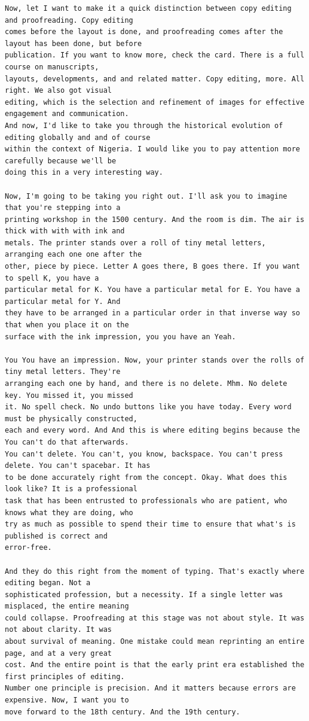 {\begin{Verbatim}
Now, let I want to make it a quick distinction between copy editing and proofreading. Copy editing
comes before the layout is done, and proofreading comes after the layout has been done, but before
publication. If you want to know more, check the card. There is a full course on manuscripts,
layouts, developments, and and related matter. Copy editing, more. All right. We also got visual
editing, which is the selection and refinement of images for effective engagement and communication.
And now, I'd like to take you through the historical evolution of editing globally and and of course
within the context of Nigeria. I would like you to pay attention more carefully because we'll be
doing this in a very interesting way.

Now, I'm going to be taking you right out. I'll ask you to imagine that you're stepping into a
printing workshop in the 1500 century. And the room is dim. The air is thick with with with ink and
metals. The printer stands over a roll of tiny metal letters, arranging each one one after the
other, piece by piece. Letter A goes there, B goes there. If you want to spell K, you have a
particular metal for K. You have a particular metal for E. You have a particular metal for Y. And
they have to be arranged in a particular order in that inverse way so that when you place it on the
surface with the ink impression, you you have an Yeah.

You You have an impression. Now, your printer stands over the rolls of tiny metal letters. They're
arranging each one by hand, and there is no delete. Mhm. No delete key. You missed it, you missed
it. No spell check. No undo buttons like you have today. Every word must be physically constructed,
each and every word. And And this is where editing begins because the You can't do that afterwards.
You can't delete. You can't, you know, backspace. You can't press delete. You can't spacebar. It has
to be done accurately right from the concept. Okay. What does this look like? It is a professional
task that has been entrusted to professionals who are patient, who knows what they are doing, who
try as much as possible to spend their time to ensure that what's is published is correct and
error-free.

And they do this right from the moment of typing. That's exactly where editing began. Not a
sophisticated profession, but a necessity. If a single letter was misplaced, the entire meaning
could collapse. Proofreading at this stage was not about style. It was not about clarity. It was
about survival of meaning. One mistake could mean reprinting an entire page, and at a very great
cost. And the entire point is that the early print era established the first principles of editing.
Number one principle is precision. And it matters because errors are expensive. Now, I want you to
move forward to the 18th century. And the 19th century.


\end{Verbatim}}
